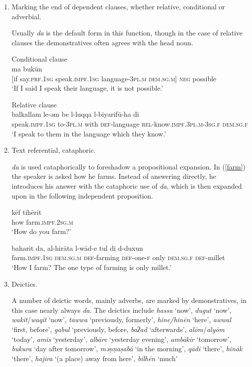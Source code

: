 \documentclass[output=paper]{langsci/langscibook}
\begin{document}
\begin{enumerate}[leftmargin=*]

\item Marking the end of dependent clauses, whether relative, conditional or adverbial.

Usually \textit{da} is the default form in this function, though in the case of relative clauses the demonstratives often agrees with the head noun.

\ea\label{gul} 
 {\label{bkm:Ref520916112}Conditional clause}\\
 ma bukūn\\
     [if say.\textsc{prf.1sg} speak.\textsc{impf.1sg} language-\textsc{3pl.m} \textsc{dem.sg.m]} \textsc{neg} possible\\
\glt ‘If I said I speak their language, it is not possible.’
\z

\ea\label{luqqa} 
{}{}{\label{bkm:Ref520916704}Relative clause}\\
\gll balkallam le-əm be l-luqqa l-biyarifū-ha di\\
     speak.\textsc{impf.1sg} to-\textsc{3pl.m} with \textsc{def}-language \textsc{rel-}know.\textsc{impf.3pl.m-3sg.f} \textsc{dem.sg.f}\\
\glt ‘I speak to them in the language which they know.’
\z

\item Text referential, cataphoric. 

\textit{da} is used cataphorically to foreshadow a propositional expansion. In (\ref{farm}) the speaker is asked how he farms. Instead of answering directly, he introduces his answer with the cataphoric use of \textit{da}, which is then expanded upon in the following independent proposition.

\ea\label{farm}
\ea
\gll kēf tihērit\\
     how farm.\textsc{impf.2sg.m}\\
\glt ‘How do you farm?’

\ex 
\gll baharit da, al-hirāta l-wād-e tul di d-duxun\\
     farm.\textsc{impf.1sg} \textsc{dem.sg.m} \textsc{def-}farming \textsc{def-}one-\textsc{f} only \textsc{dem.sg.f} \textsc{def-}millet\\
\glt ‘How I farm? The one type of farming is only millet.’\label{tul}
\z
\z

\item Deictics. 

A number of deictic words, mainly adverbs, are marked by demonstratives, in this case nearly always \textit{da}. The deictics include \textit{hassa} ‘now’, \textit{dugut} ‘now’, \textit{wakit}/\textit{waqit} ‘now’, \textit{tawwa} ‘previously, formerly’, \textit{hine/hinēn} ‘here’, \textit{awwal} ‘first, before’, \textit{gabul} ‘previously, before, \textit{baʔad} ‘afterwards’, \textit{alōm}/\textit{alyōm} ‘today’, \textit{amis} ‘yesterday’, \textit{albāre} ‘yesterday evening’, \textit{ambākir} ‘tomorrow’, \textit{bukura} ‘day after tomorrow’, \textit{mǝṇṇaṣabá} ‘in the morning’, \textit{qādi} ‘there’, \textit{hināk} ‘there’, \textit{hajira} ‘(a place) away from here’, \textit{bilhēn} ‘much’


\end{enumerate}
\end{document}
